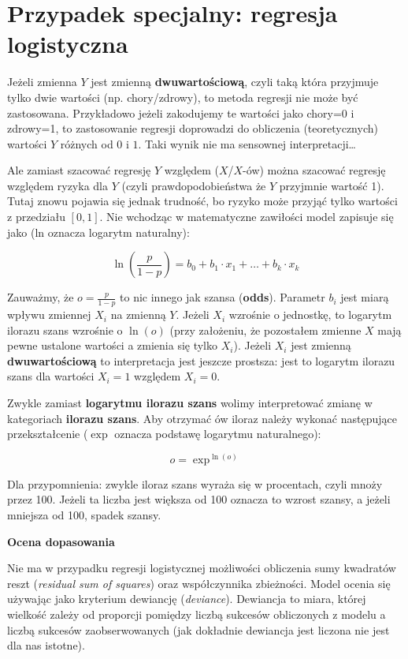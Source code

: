 \documentclass[
  openany]{book}
\begin{document}
\hypertarget{przypadek-specjalny-regresja-logistyczna}{%
\section{Przypadek specjalny: regresja logistyczna}\label{przypadek-specjalny-regresja-logistyczna}}

Jeżeli zmienna \(Y\) jest zmienną \textbf{dwuwartościową}, czyli taką która przyjmuje tylko dwie
wartości (np. chory/zdrowy), to metoda regresji nie może być zastosowana.
Przykładowo jeżeli zakodujemy te wartości jako chory=0 i zdrowy=1,
to zastosowanie regresji
doprowadzi do obliczenia (teoretycznych) wartości \(Y\) różnych od \(0\) i \(1\).
Taki wynik nie ma sensownej interpretacji\ldots{}

Ale zamiast szacować regresję \(Y\) względem (\(X\)/\(X\)-ów) można szacować
regresję względem ryzyka dla \(Y\) (czyli prawdopodobieństwa że \(Y\) przyjmnie wartość 1).
Tutaj znowu pojawia się jednak trudność, bo ryzyko może przyjąć tylko wartości
z przedziału \([0,1]\).
Nie wchodząc w matematyczne zawiłości
model zapisuje się jako (ln oznacza logarytm naturalny):

\[\ln(\frac{p}{1-p}) = b_0 + b_1 \cdot x_1  + \ldots + b_k \cdot x_k\]

Zauważmy, że \(o = \frac{p}{1-p}\) to nic innego jak szansa (\textbf{odds}).
Parametr \(b_i\) jest miarą wpływu zmiennej \(X_i\) na zmienną \(Y\).
Jeżeli \(X_i\) wzrośnie o jednostkę, to logarytm ilorazu szans
wzrośnie o \(\ln(o)\) (przy założeniu, że pozostałem zmienne \(X\) mają
pewne ustalone wartości a zmienia się tylko \(X_i\)).
Jeżeli \(X_i\) jest zmienną \textbf{dwuwartościową}
to interpretacja jest jeszcze prostsza: jest to logarytm ilorazu szans
dla wartości \(X_i=1\) względem \(X_i=0\).

Zwykle zamiast \textbf{logarytmu ilorazu szans} wolimy interpretować zmianę w kategoriach
\textbf{ilorazu szans}. Aby otrzymać ów iloraz należy wykonać następujące
przekształcenie (\(\exp\) oznacza podstawę logarytmu naturalnego):

\[o = \exp^{\ln(o)}\]

Dla przypomnienia: zwykle iloraz szans wyraża się
w procentach, czyli mnoży przez 100. Jeżeli ta liczba jest większa od 100 oznacza
to wzrost szansy, a jeżeli mniejsza od 100, spadek szansy.

\textbf{Ocena dopasowania}

Nie ma w przypadku regresji logistycznej możliwości obliczenia sumy
kwadratów reszt (\emph{residual sum of squares}) oraz współczynnika zbieżności.
Model ocenia się
używając jako kryterium dewiancję (\emph{deviance}). Dewiancja to miara, której
wielkość zależy od proporcji pomiędzy liczbą sukcesów obliczonych
z modelu a liczbą sukcesów zaobserwowanych (jak dokładnie dewiancja
jest liczona nie jest dla nas istotne).
\end{document}
